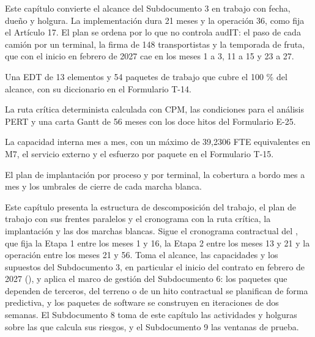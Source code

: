 %

\begin{resumenApertura}
Este capítulo convierte el alcance del Subdocumento 3 en trabajo con fecha, dueño y holgura. La
implementación dura 21 meses y la operación 36, como fija el Artículo 17. El plan se ordena por lo que
no controla audIT: el paso de cada camión por un terminal, la firma de 148 transportistas y la
temporada de fruta, que con el inicio en febrero de 2027 cae en los meses 1 a 3, 11 a 15 y 23 a 27.
\begin{recibe}
  \item Una EDT de 13 elementos y 54 paquetes de trabajo que cubre el 100 \% del alcance, con su diccionario en el Formulario T-14.
  \item La ruta crítica determinista calculada con CPM, las condiciones para el análisis PERT y una carta Gantt de 56 meses con los doce hitos del Formulario E-25.
  \item La capacidad interna mes a mes, con un máximo de 39,2306 FTE equivalentes en M7, el servicio externo y el esfuerzo por paquete en el Formulario T-15.
  \item El plan de implantación por proceso y por terminal, la cobertura a bordo mes a mes y los umbrales de cierre de cada marcha blanca.
\end{recibe}
\end{resumenApertura}

Este capítulo presenta la estructura de descomposición del trabajo, el plan de trabajo con sus
frentes paralelos y el cronograma con la ruta crítica, la implantación y las dos marchas blancas.
Sigue el cronograma contractual del , que fija la Etapa 1 entre los meses 1 y 16, la
Etapa 2 entre los meses 13 y 21 y la operación entre los meses 21 y 56. Toma el alcance, las
capacidades y los supuestos del Subdocumento 3, en particular el inicio del contrato en febrero de 2027
(), y aplica el marco de gestión del Subdocumento 6: los paquetes que
dependen de terceros, del terreno o de un hito contractual se planifican de forma predictiva, y los
paquetes de software se construyen en iteraciones de dos semanas. El Subdocumento 8 toma de este
capítulo las actividades y holguras sobre las que calcula sus riesgos, y el Subdocumento 9 las ventanas
de prueba.

